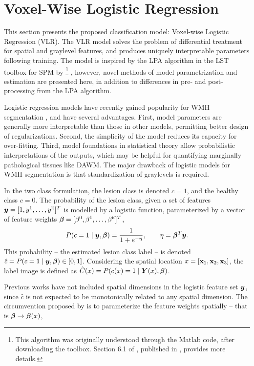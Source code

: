 \section{Voxel-Wise Logistic Regression}\label{s:vlr}
This section presents the proposed classification model: Voxel-wise Logistic Regression (VLR). The VLR model solves the problem of differential treatment for spatial and graylevel features, and produces uniquely interpretable parameters following training. The model is inspired by the LPA algorithm in the LST toolbox for SPM by \citeauthor{Schmidt2015} \cite{Schmidt2015,Schmidt2017a}%
\footnote{This algorithm was originally understood through the Matlab code, after downloading the toolbox. Section 6.1 of \cite{Schmidt2017a}, published in \citeyear{Schmidt2017a}, provides more details.}%
, however, novel methods of model parametrization and estimation are presented here, in addition to differences in pre- and post-processing from the LPA algorithm.
\par
Logistic regression models have recently gained popularity for WMH segmentation \cite{Sweeney2013a,Sweeney2013,Schmidt2017a,Zhan2017}, and have several advantages.
First, model parameters are generally more interpretable than those in other models, permitting better design of regularizations.
Second, the simplicity of the model reduces its capacity for over-fitting. 
Third, model foundations in statistical theory allow probabilistic interpretations of the outputs, which may be helpful for quantifying marginally pathological tissues like DAWM.
The major drawback of logistic models for WMH segmentation is that standardization of graylevels is required.
\par
In the two class formulation, the lesion class is denoted $c=1$, and the healthy class $c=0$. The probability of the lesion class, given a set of features $\bm{y} = [1,y^1,\dots,y^{\textsc{k}}]^T$ is modelled by a logistic function, parameterized by a vector of feature weights $\bm{\beta} = [\beta^0,\beta^1,\dots,\beta^{\textsc{k}}]^T$,
\begin{equation}
  P(c=1\mid\bm{y},\bm{\beta}) = \frac{1}{1+e^{-\eta}},\qquad\eta = \bm{\beta}^T\bm{y}.
  \label{eq:lrmodel}
\end{equation}
This probability -- the estimated lesion class label -- is denoted $\hat{c} = P(c=1\mid\bm{y},\bm{\beta}) \in [0,1]$. Considering the spatial location $x = [\mathbf{x}_1,\mathbf{x}_2,\mathbf{x}_3]$, the label image is defined as $\hat{C}(x) = P(c(x)=1\mid\bm{Y}(x),\bm{\beta})$.
\par
Previous works have not included spatial dimensions in the logistic feature set $\bm{y}$, since $\hat{c}$ is not expected to be monotonically related to any spatial dimension. The circumvention proposed by \citeauthor{Schmidt2015} is to parameterize the feature weights spatially -- that is $\bm{\beta}\rightarrow\bm{\beta}(x)$,
